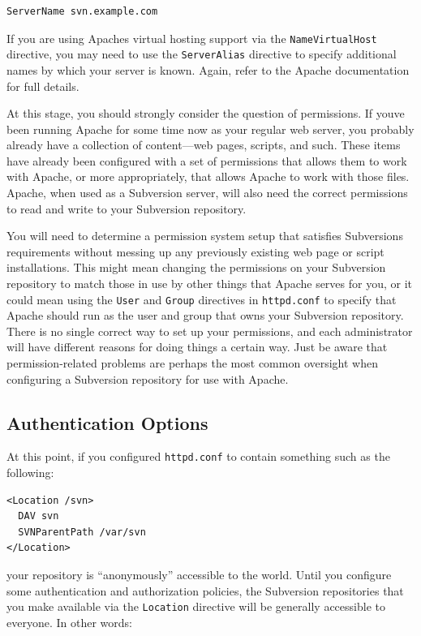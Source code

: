 \begin{verbatim}
ServerName svn.example.com
\end{verbatim}

If you are using Apache\textquotesingle s virtual hosting support via
the \texttt{NameVirtualHost} directive, you may need to use the
\texttt{ServerAlias} directive to specify additional names by which your
server is known. Again, refer to the Apache documentation for full
details.

At this stage, you should strongly consider the question of permissions.
If you\textquotesingle ve been running Apache for some time now as your
regular web server, you probably already have a collection of
content---web pages, scripts, and such. These items have already been
configured with a set of permissions that allows them to work with
Apache, or more appropriately, that allows Apache to work with those
files. Apache, when used as a Subversion server, will also need the
correct permissions to read and write to your Subversion repository.

You will need to determine a permission system setup that satisfies
Subversion\textquotesingle s requirements without messing up any
previously existing web page or script installations. This might mean
changing the permissions on your Subversion repository to match those in
use by other things that Apache serves for you, or it could mean using
the \texttt{User} and \texttt{Group} directives in \texttt{httpd.conf}
to specify that Apache should run as the user and group that owns your
Subversion repository. There is no single correct way to set up your
permissions, and each administrator will have different reasons for
doing things a certain way. Just be aware that permission-related
problems are perhaps the most common oversight when configuring a
Subversion repository for use with Apache.

\subsection{Authentication Options}\label{svn.serverconfig.httpd.authn}

At this point, if you configured \texttt{httpd.conf} to contain
something such as the following:

\begin{verbatim}
<Location /svn>
  DAV svn
  SVNParentPath /var/svn
</Location>
\end{verbatim}

your repository is ``anonymously'' accessible to the world. Until you
configure some authentication and authorization policies, the Subversion
repositories that you make available via the \texttt{Location} directive
will be generally accessible to everyone. In other words:


